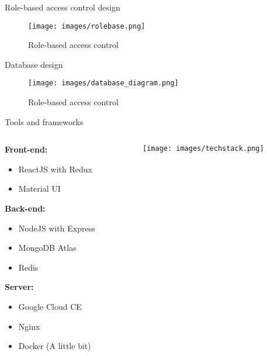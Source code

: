 \documentclass{beamer}
\begin{document}
\begin{frame}{Role-based access control design}
\begin{figure}[htp]
    \centering
    \texttt{[image: images/rolebase.png]}
    \caption{Role-based access control}
    \label{fig:sysarch}
\end{figure}
\end{frame}

\begin{frame}{Database design}
\begin{figure}[htp]
    \centering
    \texttt{[image: images/database\_diagram.png]}
    \caption{Role-based access control}
    \label{fig:sysarch}
\end{figure}
\end{frame}

\begin{frame}{Tools and frameworks}
    \begin{columns}
    \linespread{1.0}
    \hspace{-1cm}
    \begin{column}{5cm}
        \textbf{Front-end:}
        \begin{itemize}
            \item ReactJS with Redux
            \item Material UI
        \end{itemize}
        \textbf{Back-end: }
        \begin{itemize}
            \item NodeJS with Express
            \item MongoDB Atlas
            \item Redis
        \end{itemize}
        \textbf{Server: }
        \begin{itemize}
            \item Google Cloud CE
            \item Nginx
            \item Docker (A little bit)
        \end{itemize}
    \end{column}
    
    \hspace{-1cm}
    \begin{column}{5cm}
        \texttt{[image: images/techstack.png]}  
    \end{column}
    \end{columns}
\end{frame}
\end{document}
